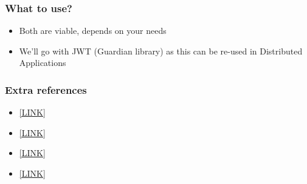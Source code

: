 \begin{frame}
    \frametitle{What to use?}

    \begin{itemize}
        \item Both are viable, depends on your needs
        \item We'll go with JWT (Guardian library) as this can be re-used in Distributed Applications
    \end{itemize}
\end{frame}

\begin{frame}
    \frametitle{Extra references}

    \begin{itemize}
        \item \href{https://medium.com/@sherryhsu/session-vs-token-based-authentication-11a6c5ac45e4}{[LINK]}
        \item \href{https://auth0.com/learn/json-web-tokens/}{[LINK]}
        \item \href{https://medium.com/@theflyingmantis/session-vs-jwt-token-based-authentication-2e85ff6c8f42}{[LINK]}
        \item \href{https://ponyfoo.com/articles/json-web-tokens-vs-session-cookies}{[LINK]}
    \end{itemize}
\end{frame}

